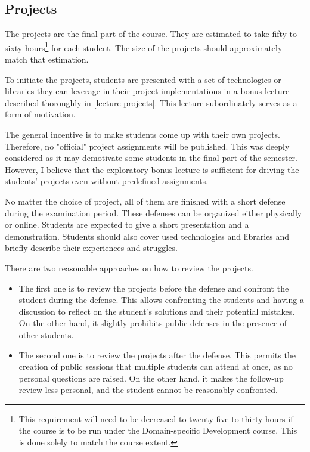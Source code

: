 \documentclass[
  digital,
  color,
  oneside,
  nosansbold,
  nocolorbold,
  nolof,
  nolot,
]{fithesis4}
\begin{document}
\subsection{Projects}

The projects are the final part of the course. They are estimated to take fifty to sixty hours\footnote{This requirement will need to be decreased to twenty-five to thirty hours if the course is to be run under the Domain-specific Development course. This is done solely to match the course extent.} for each student. The size of the projects should approximately match that estimation.

To initiate the projects, students are presented with a set of technologies or libraries they can leverage in their project implementations in a bonus lecture described thoroughly in \cref{lecture-projects}. This lecture subordinately serves as a form of motivation.

The general incentive is to make students come up with their own projects. Therefore, no "official" project assignments will be published. This was deeply considered as it may demotivate some students in the final part of the semester. However, I believe that the exploratory bonus lecture is sufficient for driving the students' projects even without predefined assignments.

No matter the choice of project, all of them are finished with a short defense during the examination period. These defenses can be organized either physically or online. Students are expected to give a short presentation and a demonstration. Students should also cover used technologies and libraries and briefly describe their experiences and struggles.

There are two reasonable approaches on how to review the projects.
\begin{itemize}
    \item The first one is to review the projects before the defense and confront the student during the defense. This allows confronting the students and having a discussion to reflect on the student's solutions and their potential mistakes. On the other hand, it slightly prohibits public defenses in the presence of other students.
    \item The second one is to review the projects after the defense. This permits the creation of public sessions that multiple students can attend at once, as no personal questions are raised. On the other hand, it makes the follow-up review less personal, and the student cannot be reasonably confronted.
\end{itemize}
\end{document}
